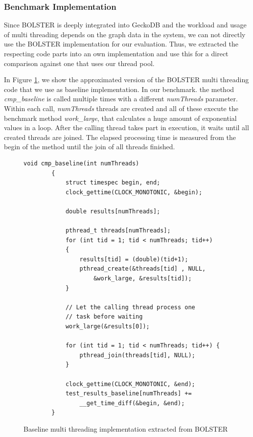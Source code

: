 \documentclass[conference]{IEEEtran}
\begin{document}
\subsubsection{Benchmark Implementation}
Since BOLSTER is deeply integrated into GeckoDB and the workload and usage of multi threading depends on the graph data in the system, we can not directly use the BOLSTER implementation for our evaluation. Thus, we extracted the respecting code parts into an own implementation and use this for a direct comparison against one that uses our thread pool. 

In Figure \ref{fig4}, we show the approximated version of the BOLSTER multi threading code that we use as baseline implementation. In our benchmark. the method \emph{cmp\_baseline} is called multiple times with a different \emph{numThreads} parameter. Within each call, \emph{numThreads} threads are created and all of these execute the benchmark method \emph{work\_large}, that calculates a huge amount of exponential values in a loop. After the calling thread takes part in execution, it waits until all created threads are joined. The elapsed processing time is measured from the begin of the method until the join of all threads finished.

\begin{figure}
	\begin{lstlisting}[style=CStyle,numbers=none]
		void cmp_baseline(int numThreads)
		{
			struct timespec begin, end;
			clock_gettime(CLOCK_MONOTONIC, &begin);
			
			double results[numThreads];
			
			pthread_t threads[numThreads];
			for (int tid = 1; tid < numThreads; tid++)
			{
				results[tid] = (double)(tid+1);
				pthread_create(&threads[tid] , NULL, 
					&work_large, &results[tid]);
			}
			
			// Let the calling thread process one 
			// task before waiting
			work_large(&results[0]);
			
			for (int tid = 1; tid < numThreads; tid++) {
				pthread_join(threads[tid], NULL);
			}
			
			clock_gettime(CLOCK_MONOTONIC, &end);
			test_results_baseline[numThreads] +=
				__get_time_diff(&begin, &end);
		}
	\end{lstlisting}
	\caption{Baseline multi threading implementation extracted from BOLSTER}
	\label{fig4}
\end{figure}
\end{document}
